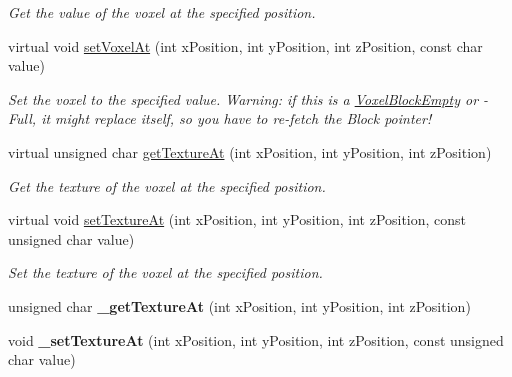 \begin{DoxyCompactItemize}
\begin{DoxyCompactList}\small\item\em \-Get the value of the voxel at the specified position. \end{DoxyCompactList}\item 
\hypertarget{classVoxelBlockFull_a6ae41a4aca6d6751fb9b75093bbdbd96}{
virtual void \hyperlink{classVoxelBlockFull_a6ae41a4aca6d6751fb9b75093bbdbd96}{set\-Voxel\-At} (int x\-Position, int y\-Position, int z\-Position, const char value)}
\label{db/d9c/classVoxelBlockFull_a6ae41a4aca6d6751fb9b75093bbdbd96}

\begin{DoxyCompactList}\small\item\em \-Set the voxel to the specified value. \-Warning\-: if this is a \hyperlink{classVoxelBlockEmpty}{\-Voxel\-Block\-Empty} or -\/\-Full, it might replace itself, so you have to re-\/fetch the \-Block pointer! \end{DoxyCompactList}\item 
\hypertarget{classVoxelBlockFull_a5c87150d7e9a3ab5291dd0849f3aea7a}{
virtual unsigned char \hyperlink{classVoxelBlockFull_a5c87150d7e9a3ab5291dd0849f3aea7a}{get\-Texture\-At} (int x\-Position, int y\-Position, int z\-Position)}
\label{db/d9c/classVoxelBlockFull_a5c87150d7e9a3ab5291dd0849f3aea7a}

\begin{DoxyCompactList}\small\item\em \-Get the texture of the voxel at the specified position. \end{DoxyCompactList}\item 
\hypertarget{classVoxelBlockFull_a44f738ddbb878bd0831cc4926b47bf7d}{
virtual void \hyperlink{classVoxelBlockFull_a44f738ddbb878bd0831cc4926b47bf7d}{set\-Texture\-At} (int x\-Position, int y\-Position, int z\-Position, const unsigned char value)}
\label{db/d9c/classVoxelBlockFull_a44f738ddbb878bd0831cc4926b47bf7d}

\begin{DoxyCompactList}\small\item\em \-Set the texture of the voxel at the specified position. \end{DoxyCompactList}\item 
\hypertarget{classVoxelBlockFull_abbc913efacf693036c51bc72194fd8fd}{
unsigned char {\bfseries \-\_\-get\-Texture\-At} (int x\-Position, int y\-Position, int z\-Position)}
\label{db/d9c/classVoxelBlockFull_abbc913efacf693036c51bc72194fd8fd}

\item 
\hypertarget{classVoxelBlockFull_adfeb1489bb034cf6a882caf675ff3c54}{
void {\bfseries \-\_\-set\-Texture\-At} (int x\-Position, int y\-Position, int z\-Position, const unsigned char value)}
\label{db/d9c/classVoxelBlockFull_adfeb1489bb034cf6a882caf675ff3c54}

\end{DoxyCompactItemize}
